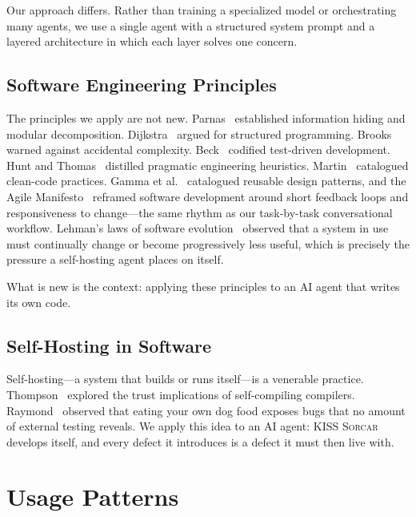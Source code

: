 \documentclass{article}
\newcommand{\kisssys}{\textsc{KISS Sorcar}}
\begin{document}
Our approach differs.
Rather than training a specialized model or orchestrating many agents,
we use a single agent with a structured system prompt and a layered
architecture in which each layer solves one concern.

\subsection{Software Engineering Principles}

The principles we apply are not new.
Parnas~\cite{parnas1972criteria} established information hiding
and modular decomposition.
Dijkstra~\cite{dijkstra1968goto} argued for structured programming.
Brooks~\cite{brooks1995mythical} warned against accidental complexity.
Beck~\cite{beck2003tdd} codified test-driven development.
Hunt and Thomas~\cite{hunt1999pragmatic} distilled pragmatic
engineering heuristics.
Martin~\cite{martin2008clean} catalogued clean-code practices.
Gamma et al.~\cite{gamma1994design} catalogued reusable design patterns,
and the Agile Manifesto~\cite{beck2001manifesto} reframed software
development around short feedback loops and responsiveness to change---the
same rhythm as our task-by-task conversational workflow.
Lehman's laws of software evolution~\cite{lehman1980programs} observed
that a system in use must continually change or become progressively less
useful, which is precisely the pressure a self-hosting agent places on
itself.

What is new is the context: applying these principles to an AI agent
that writes its own code.

\subsection{Self-Hosting in Software}

Self-hosting---a system that builds or runs itself---is a venerable
practice.
Thompson~\cite{thompson1984reflections} explored the trust
implications of self-compiling compilers.
Raymond~\cite{raymond1999cathedral} observed that eating your own
dog food exposes bugs that no amount of external testing reveals.
We apply this idea to an AI agent: \kisssys{} develops itself, and
every defect it introduces is a defect it must then live with.

\section{Usage Patterns}
\label{sec:patterns}
\end{document}
